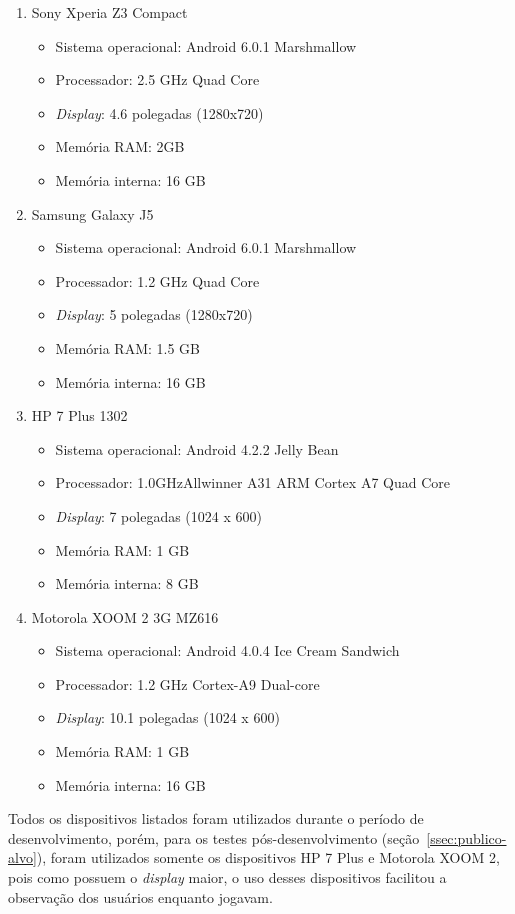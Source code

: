 \begin{enumerate}
	\item Sony Xperia Z3 Compact
	\begin{itemize}
		\item Sistema operacional: Android 6.0.1 Marshmallow
		\item Processador: 2.5 GHz Quad Core
		\item \textit{Display}: 4.6 polegadas (1280x720)
		\item Memória RAM: 2GB
		\item Memória interna: 16 GB
	\end{itemize}
	\item Samsung Galaxy J5
	\begin{itemize}
		\item Sistema operacional: Android 6.0.1 Marshmallow
		\item Processador: 1.2 GHz Quad Core
		\item \textit{Display}: 5 polegadas (1280x720)
		\item Memória RAM: 1.5 GB
		\item Memória interna: 16 GB
	\end{itemize}
	\item HP 7 Plus 1302
	\begin{itemize}
		\item Sistema operacional: Android 4.2.2 Jelly Bean
		\item Processador: 1.0GHzAllwinner A31 ARM Cortex A7 Quad Core
		\item \textit{Display}: 7 polegadas (1024 x 600)
		\item Memória RAM: 1 GB
		\item Memória interna: 8 GB
	\end{itemize}
	\item Motorola XOOM 2 3G MZ616
	\begin{itemize}
		\item Sistema operacional: Android 4.0.4 Ice Cream Sandwich
		\item Processador: 1.2 GHz Cortex-A9 Dual-core 
		\item \textit{Display}: 10.1 polegadas (1024 x 600)
		\item Memória RAM: 1 GB
		\item Memória interna: 16 GB
	\end{itemize}
\end{enumerate}

Todos os dispositivos listados foram utilizados durante o período de desenvolvimento, porém, para os testes pós-desenvolvimento (seção~\ref{ssec:publico-alvo}), foram utilizados somente os dispositivos HP 7 Plus e Motorola XOOM 2, pois como possuem o \textit{display} maior, o uso desses dispositivos facilitou a observação dos usuários enquanto jogavam. 

